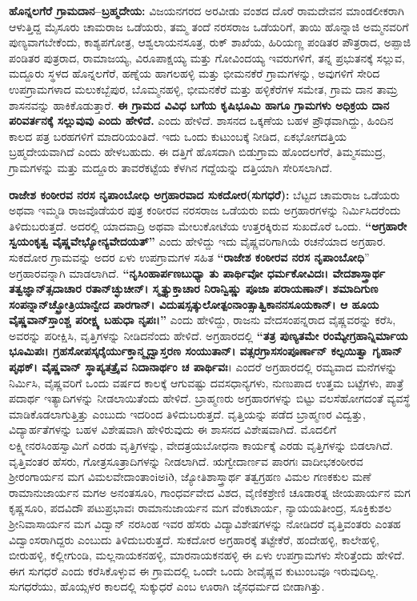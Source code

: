 \textbf{ಹೊನ್ನಲಗೆರೆ ಗ್ರಾಮದಾನ–ಬ್ರಹ್ಮದೇಯ:} ವಿಜಯನಗರದ ಅರವೀಡು ವಂಶದ ದೊರೆ ರಾಮದೇವನ ಮಾಂಡಲೀಕರಾಗಿ ಆಳುತ್ತಿದ್ದ ಮೈಸೂರು ಚಾಮರಾಜ ಒಡೆಯರು, ತಮ್ಮ ತಂದೆ ನರಸರಾಜ ಒಡೆಯರಿಗೆ, ತಾಯಿ ಹೊನ್ನಾಜಿ ಅಮ್ಮನವರಿಗೆ ಪುಣ್ಯವಾಗಬೇಕೆಂದು, ಕಾಶ್ಯಪಗೋತ್ರ, ಆಶ್ವಲಾಯನಸೂತ್ರ, ರುಕ್​ ಶಾಖೆಯ, ಹಿರಿಯಣ್ಣ ಪಂಡಿತರ ಪೌತ್ರರಾದ, ಅಪ್ಪಾಜಿ ಪಂಡಿತರ ಪುತ್ರರಾದ, ರಾಮಾಜಯ್ಯ, ವಿರೂಪಾಕ್ಷಯ್ಯ ಮತ್ತು ಗೋವಿಂದಯ್ಯ ಇವರುಗಳಿಗೆ, ತನ್ನ ಪ್ರಭುತನಕ್ಕೆ ಸಲ್ಲುವ, ಮದ್ದೂರು ಸ್ಥಳದ ಹೊನ್ನಲಗೆರೆ, ಹಣ್ನೆಯ ಹಾಗಲಹಳ್ಳಿ ಮತ್ತು ಭೀಮನಕೆರೆ ಗ್ರಾಮಗಳನ್ನು, ಅವುಗಳಿಗೆ ಸೇರಿದ ಉಪಗ್ರಾಮಗಳಾದ ಮಲುಕಬ್ಬೆಪುರ, ಬೊಮ್ಮನಹಳ್ಳಿ, ಭೀಮನಕೆರೆ ಮತ್ತು ಹಳ್ಳಿಕೆರೆಗಳ ಸಮೇತ, ಗ್ರಾಮ ದಾನ ತಾಮ್ರ ಶಾಸನವನ್ನು ಹಾಕಿಕೊಡುತ್ತಾರೆ. \textbf{ಈ ಗ್ರಾಮದ ವಿವಿಧ ಬಗೆಯ ಕೃಷಿಭೂಮಿ ಹಾಗೂ ಗ್ರಾಮಗಳು ಅಧಿಕ್ರಯ ದಾನ ಪರಿವರ್ತನಕ್ಕೆ ಸಲ್ಲುವುವು ಎಂದು ಹೇಳಿದೆ. }ಎಂದು ಹೇಳಿದೆ. ಶಾಸನದ ಒಕ್ಕಣೆಯ ಬಹಳ ಪ್ರೌಢವಾಗಿದ್ದು, ಹಿಂದಿನ ಕಾಲದ ಪತ್ರ ಬರಹಗಳಿಗೆ ಮಾದರಿಯಂತಿದೆ. ಇದು ಒಂದು ಕುಟುಂಬಕ್ಕೆ ನೀಡಿದ, ಏಕಭೋಗದತ್ತಿಯ ಬ್ರಹ್ಮದೇಯವಾಗಿದೆ ಎಂದು ಹೇಳಬಹುದು. ಈ ದತ್ತಿಗೆ ಹೊಸದಾಗಿ ಬಿಡುಗ್ರಾಮ ಹೊಂದಲಗೆರೆ, ತಿಮ್ಮಸಮುದ್ರ, ಗ್ರಾಮಗಳನ್ನು ಮತ್ತು ಮದ್ದೂರು ತಾವರೆಕಟ್ಟೆಯ ಕೆಳಗಿನ ಗದ್ದೆಯನ್ನು ದತ್ತಿಯಾಗಿ ಸೇರಿಸಲಾಗಿದೆ.

\textbf{ರಾಜೇಶ ಕಂಠೀರವ ನರಸ ನೃಪಾಂಬೋಧಿ ಅಗ್ರಹಾರವಾದ ಸುಕದೋರ(ಸುಗಧರೆ):} ಬೆಟ್ಟದ ಚಾಮರಾಜ ಒಡೆಯರು ಅಥವಾ ಇಮ್ಮಡಿ ರಾಜವೊಡೆಯರ ಪುತ್ರ ಕಂಠೀರವ ನರಸರಾಜ ಒಡೆಯರು ಐದು ಅಗ್ರಹಾರಗಳನ್ನು ನಿರ್ಮಿಸಿದರೆಂದು ತಿಳಿದುಬರುತ್ತದೆ. ಅದರಲ್ಲಿ ಯಾದವಾದ್ರಿ ಅಥವಾ ಮೇಲುಕೋಟೆಯ ಉತ್ತರಕ್ಕಿರುವ ಸುಖದೊರೆ ಒಂದು. \textbf{“ಅಗ್ರಹಾರೇ ಸ್ವಯಂಕೃತ್ವ ವೈಷ್ಣವೇಭ್ಯೋನ್ಯವೇದಯತ್​”} ಎಂದು ಹೇಳಿದ್ದು ಇದು ವೈಷ್ಣವರಿಗಾಗಿಯೆ ರಚನೆಯಾದ ಅಗ್ರಹಾರ. ಸುಕದೋರ ಗ್ರಾಮವನ್ನು ಅದರ ಏಳು ಉಪಗ್ರಾಮಗಳ ಸಹಿತ \textbf{“ರಾಜೇಶ ಕಂಠೀರವ ನರಸ ನೃಪಾಂಬೋಧಿ}” ಅಗ್ರಹಾರವನ್ನಾಗಿ ಮಾಡಲಾಗಿದೆ. \textbf{“ನೃಸಿಂಹಾರ್ಪಣಬುಧ್ಯಾ ತು ಪಾರ್ಥಿವೋ ಧರ್ಮಕೋವಿದಃ। ವೇದಶಾಸ್ತ್ರಾರ್ಥ ತತ್ವಜ್ಞಾನ್​ತ್ಸದಾಚಾರ ರತಾನ್​ಚ್ಛುಚೀನ್​। ಸ್ಮೃತ್ಯುಕ್ತಾಚಾರ ನಿರಾನ್ವಿಷ್ಣು ಪೂಜಾ ಪರಾಯಣಾನ್​। ಶಮಾದಿಗುಣ ಸಂಪನ್ನಾನ್​ ಚ್ಛ್ರೋತ್ರಿಯಾನ್ವೇದ ಪಾರಗಾನ್​। ವಿದುಷಸ್ಸತ್ಕುಲೋತ್ಪಂನಾಂತ್ಸಾತ್ವಿಕಾನನಸೂಯಕಾನ್​। ಆ ಹೂಯ ವೈಷ್ಣವಾನ್​ಸ್ತಾಂಶ್ಚ ಪರೀಕ್ಷ್ಯ ಬಹುಧಾ ನೃಪಃ।”} ಎಂದು ಹೇಳಿದ್ದು, ರಾಜನು ವೇದಸಂಪನ್ನರಾದ ವೈಷ್ಣವರನ್ನು ಕರೆಸಿ, ಅವರನ್ನು ಪರೀಕ್ಷಿಸಿ, ವೃತ್ತಿಗಳನ್ನು ನೀಡಿದನೆಂದು ಹೇಳಿದೆ. ಅಗ್ರಹಾರದಲ್ಲಿ \textbf{“ತತ್ರ ಪುಣ್ಯತಮೇ ರಂಮ್ಯೇಗ್ರಹಾನ್ನಿರ್ಮಾಯ ಭೂಮಿಪಃ। ಗ್ರಹಸೋಪಸ್ಕರೈರ್ಯುಕ್ತಾನ್ಮೃದ್ವಾಸ್ತರಣ ಸಂಯುತಾನ್​। ವತ್ಸರಗ್ರಾಸಸಂಪೂರ್ಣಾನ್​ ಕಲ್ಪಯಿತ್ವಾ ಗೃಹಾನ್​ ಪೃಥಕ್​। ವೈಷ್ಣವಾನ್​ ಸ್ಥಾಪ್ಯತತ್ರೈವ ನಿದಾನಾರ್ಥಂ ಚ ಪಾರ್ಥಿವಃ}। ಎಂದರೆ ಅಗ್ರಹಾರದಲ್ಲಿ ರಮ್ಯವಾದ ಮನೆಗಳನ್ನು ನಿರ್ಮಿಸಿ, ವೈಷ್ಣವರಿಗೆ ಒಂದು ವರ್ಷದ ಕಾಲಕ್ಕೆ ಆಗುವಷ್ಟು ದವಸಧಾನ್ಯಗಳು, ನುಣುಪಾದ ಉತ್ತಮ ಬಟ್ಟೆಗಳು, ಪಾತ್ರೆ ಪದಾರ್ಥ ಇತ್ಯಾದಿಗಳನ್ನು ನೀಡಲಾಯಿತೆಂದು ಹೇಳಿದೆ. ಬ್ರಾಹ್ಮಣರು ಅಗ್ರಹಾರಗಳನ್ನು ಬಿಟ್ಟು ವಲಸೆಹೋಗದಂತೆ ವ್ಯವಸ್ಥೆ ಮಾಡಿಕೊಡಲಾಗುತ್ತಿತ್ತು ಎಂಬುದು ಇದರಿಂದ ತಿಳಿದುಬರುತ್ತದೆ. ವೃತ್ತಿಯನ್ನು ಪಡೆದ ಬ್ರಾಹ್ಮಣರ ವಿದ್ವತ್ತು, ವಿದ್ಯಾರ್ಹತೆಗಳನ್ನು ಬಹಳ ವಿಶೇಷವಾಗಿ ಹೇಳಿರುವುದು ಈ ಶಾಸನದ ವಿಶೇಷವಾಗಿದೆ. ಮೊದಲಿಗೆ ಲಕ್ಷ್ಮೀನರಸಿಂಹಸ್ವಾಮಿಗೆ ಎರಡು ವೃತ್ತಿಗಳನ್ನು, ವೇದತ್ರಯಬೋಧನಾ ಕಾರ್ಯಕ್ಕೆ ಎರಡು ವೃತ್ತಿಗಳನ್ನು ಬಿಡಲಾಗಿದೆ. ವೃತ್ತಿವಂತರ ಹೆಸರು, ಗೋತ್ರಸೂತ್ರಾದಿಗಳನ್ನು ನೀಡಲಾಗಿದೆ. ಋಗ್ವೇದಾರ್ಣವ ಪಾರಗಃ ವಾದೀಭಕಂಠೀರವ ಶ‍್ರೀರಂಗಾರ್ಯನ ಮಗ ವಿಮಲವೇದಾಂತಾಂiಅið, ಜ್ಯೋತಿಶಾಸ್ತ್ರಾರ್ಥ ತತ್ವಗ್ರಹಣ ವಿಮಲ ಗಣಕಕುಲ ಮಣೆ ರಾಮಾನುಜಾರ್ಯನ ಮಗಅ ಅನಂತಸೂರಿ, ಗಾಂಧರ್ವವೇದ ವಿಶದ, ವೈಣಿಕಶ್ರೇಣಿ ಚೂಡಾರತ್ನ ಜೀಯಪಾರ್ಯನ ಮಗ ಕೃಷ್ಣಸೂರಿ, ಪದವಿದೌ ಪಟುಪ್ರಭಾವಃ ರಾಮಾನುಜಾರ್ಯನ ಮಗ ವೆಂಕಟಾರ್ಯ, ನ್ಯಾಯಯತೀಂದ್ರ, ಸೂಕ್ತಿಕುಶಲ ಶ‍್ರೀನಿವಾಸಾರ್ಯನ ಮಗ ವಿದ್ವಾನ್​ ನರಸಿಂಹ ಇವರ ಹೆಸರು ವಿದ್ಯಾವಿಶೇಷಗಳನ್ನು ನೋಡಿದರೆ ವೃತ್ತಿವಂತರು ಎಂತಹ ವಿದ್ವಾಂಸರಾಗಿದ್ದರು ಎಂಬುದು ತಿಳಿದುಬರುತ್ತದೆ. ಸುಕದೋರ ಅಗ್ರಹಾರಕ್ಕೆ ತಟ್ಟೇಕೆರೆ, ಹಂದೇಹಳ್ಳಿ, ಕಾಲೇಹಳ್ಳಿ, ಬೀರುಹಳ್ಳಿ, ಕಲ್ಲೀಗುಂಡಿ, ಮಲ್ಲನಾಯಕನಹಳ್ಳಿ, ಮಾರನಾಯಕನಹಳ್ಳಿ ಈ ಏಳು ಉಪಗ್ರಾಮಗಳು ಸೇರಿತ್ತೆಂದು ಹೇಳಿದೆ. ಈಗ ಸುಗಧರೆ ಎಂದು ಕರೆಸಿಕೊಳ್ಳುವ ಈ ಗ್ರಾಮದಲ್ಲಿ ಒಂದೇ ಒಂದು ಶೀವೈಷ್ಣವ ಕುಟುಂಬವೂ ಇರುವುದಿಲ್ಲ. ಸುಗಧರೆಯು, ಹೊಯ್ಸಳರ ಕಾಲದಲ್ಲಿ ಸುಕ್ಕುಧರೆ ಎಂಬ ಊರಾಗಿ ಜೈನಧರ್ಮದ ಬೀಡಾಗಿತ್ತು. 

